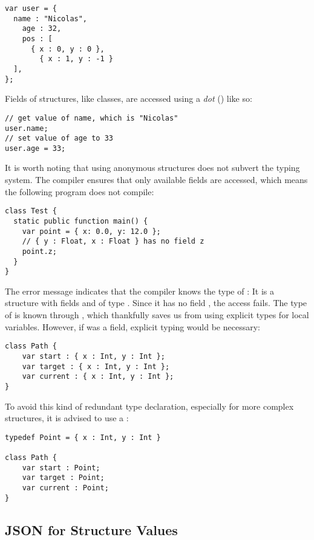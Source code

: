
\begin{lstlisting}
var user = {
  name : "Nicolas",
	age : 32,
	pos : [
	  { x : 0, y : 0 },
		{ x : 1, y : -1 }
  ],
};
\end{lstlisting}
Fields of structures, like classes, are accessed using a \emph{dot} () like so:

\begin{lstlisting}
// get value of name, which is "Nicolas"
user.name;
// set value of age to 33
user.age = 33;
\end{lstlisting}
It is worth noting that using anonymous structures does not subvert the typing system. The compiler ensures that only available fields are accessed, which means the following program does not compile:

\begin{lstlisting}
class Test {
  static public function main() {
    var point = { x: 0.0, y: 12.0 };
    // { y : Float, x : Float } has no field z
    point.z;
  }
}
\end{lstlisting}
The error message indicates that the compiler knows the type of : It is a structure with fields  and  of type . Since it has no field , the access fails.
The type of  is known through , which thankfully saves us from using explicit types for local variables. However, if  was a field, explicit typing would be necessary:

\begin{lstlisting}
class Path {
    var start : { x : Int, y : Int };
    var target : { x : Int, y : Int };
    var current : { x : Int, y : Int };
}
\end{lstlisting}
To avoid this kind of redundant type declaration, especially for more complex structures, it is advised to use a :

\begin{lstlisting}
typedef Point = { x : Int, y : Int }

class Path {
    var start : Point;
    var target : Point;
    var current : Point;
}
\end{lstlisting}


\subsection{JSON for Structure Values}
\label{types-structure-json}

